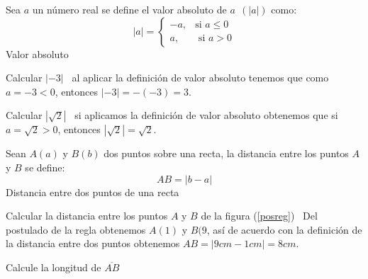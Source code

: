 \begin{definicion}{ Sea $a$ un n\'{u}mero real se define el valor absoluto de $a~\ (\left\vert
a\right\vert )$ como:%
\begin{equation*}
\left\vert a\right\vert =\left\{
\begin{array}{cc}
-a, & \text{si }a\leq 0 \\
a, & \text{ si }a>0%
\end{array}%
\right.
\end{equation*}}{Valor absoluto}
 \end{definicion}
\begin{ejemplo}{ Calcular $\left\vert -3\right\vert $}
 \solucion \, al aplicar la definición de valor absoluto tenemos que como $a=-3<0$, entonces $\left\vert -3\right\vert =-\left( -3\right) =3$.
\end{ejemplo}
\begin{ejemplo}{Calcular $\left\vert \sqrt{2}\right\vert$}
\solucion \, si aplicamos la definición de valor absoluto obtenemos que si  $a=\sqrt{2}>0$, entonces $\left\vert \sqrt{2}\right\vert =\sqrt{2}$.
\end{ejemplo}
\begin{definicion}{Sean $A\left( a\right) $ y $B\left( b\right) $ dos puntos sobre una recta,
la distancia entre los puntos $A$ y $B$ se define:%
\begin{equation*}
AB=\left\vert b-a\right\vert
\end{equation*}}{Distancia entre dos puntos de una recta}
 \begin{ejemplo}{Calcular la distancia entre los puntos $A$ y $B$ de la figura (\ref{posreg})}
  \solucion\, Del postulado de la regla obtenemos $A(1)$ y $B(9$, así de acuerdo
con la definición de la
distancia entre dos puntos obtenemos $AB=|9cm-1cm|= 8cm$.
  \end{ejemplo}
\begin{ejemplo}{Calcule la longitud de $\overline{AB}$}
 \begin{center}
\end{center}
\end{ejemplo}

\end{definicion}

